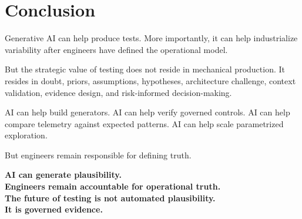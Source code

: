 \documentclass[11pt,a4paper]{article}
\begin{document}
\section{Conclusion}

Generative AI can help produce tests. More importantly, it can help industrialize variability after engineers have defined the operational model.

But the strategic value of testing does not reside in mechanical production. It resides in doubt, priors, assumptions, hypotheses, architecture challenge, context validation, evidence design, and risk-informed decision-making.

AI can help build generators. AI can help verify governed controls. AI can help compare telemetry against expected patterns. AI can help scale parametrized exploration.

But engineers remain responsible for defining truth.

\begin{center}
\Large
\textbf{AI can generate plausibility.}\\[0.2cm]
\textbf{Engineers remain accountable for operational truth.}\\[0.4cm]
\textbf{The future of testing is not automated plausibility.}\\[0.2cm]
\textbf{It is governed evidence.}
\end{center}

\newpage
\end{document}
